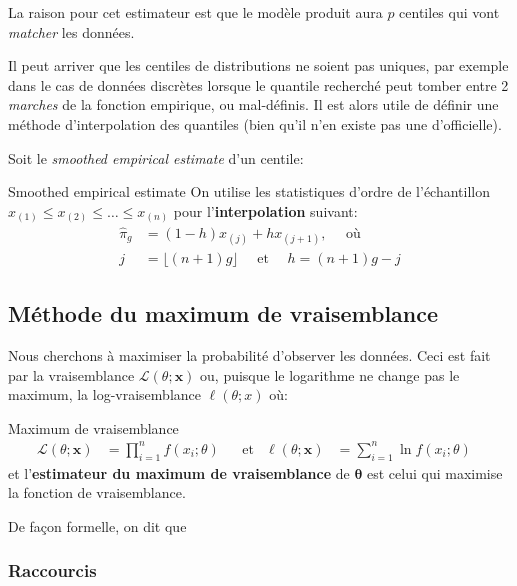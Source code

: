 \documentclass[10pt, french]{article}
\begin{document}
\begin{multicols*}{2}
La raison pour cet estimateur est que le modèle produit aura $p$ centiles qui vont \og \textit{matcher} \fg{} les données.

Il peut arriver que les centiles de distributions ne soient pas uniques, par exemple dans le cas de données discrètes lorsque le quantile recherché peut tomber entre 2 \emph{marches} de la fonction empirique, ou mal-définis.
Il est alors utile de définir une méthode d'interpolation des quantiles (bien qu'il n'en existe pas une d'officielle).

Soit le \og \textit{smoothed empirical estimate} \fg{} d'un centile:

\begin{algo}{Smoothed empirical estimate}
On utilise les statistiques d'ordre de l'échantillon $x_{(1)} \le x_{(2)} \le \dots \le x_{(n)}$ pour l'\textbf{interpolation} suivant:
\begin{align*}
	\hat\pi_{g}
	&=	(1 - h)x_{(j)} + h x_{(j + 1)}, \quad \text{ où }	\\
	j
	&=	\lfloor (n + 1) g \rfloor	\quad
	\text{ et }	\quad
	h
	=	(n + 1) g - j
\end{align*}
\end{algo}


\columnbreak
\subsection{Méthode du maximum de vraisemblance}

Nous cherchons à maximiser la probabilité d'observer les données.
Ceci est fait par la vraisemblance $\mathcal{L}(\theta; \bm{x})$ ou, puisque le logarithme ne change pas le maximum, la log-vraisemblance $\ell(\theta; x)$ où:

\begin{algo}{Maximum de vraisemblance}
\begin{align*}
	\mathcal{L}(\theta; \bm{x})
	&=	\prod_{i = 1}^{n}	f(x_{i}; \theta)	&
	&\text{et}	&
	\ell(\theta; \bm{x})
	&=	\sum_{i = 1}^{n} \ln	f(x_{i}; \theta)	&
\end{align*}
et l'\textbf{estimateur du maximum de vraisemblance} de $\bm\theta$ est celui qui maximise la fonction de vraisemblance.
\end{algo}

De façon formelle, on dit que 

\subsubsection{Raccourcis}


\end{multicols*}
\end{document}
